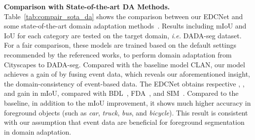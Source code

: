 \documentclass[journal]{IEEEtran}
\begin{document}

\textbf{Comparison with State-of-the-art DA Methods.}
{Table~\ref{tab:compair_sota_da} shows the comparison between our EDCNet and some state-of-the-art domain adaptation methods~\cite{wang2020differential}\cite{luo2019CLAN}\cite{li2019bidirectional}\cite{yang2020fda}. Results including mIoU and IoU for each category are tested on the target domain, \textit{i.e.} DADA-seg dataset. For a fair comparison, these models are trained based on the default settings recommended by the referenced works, to perform domain adaptation from Cityscapes to DADA-seg. Compared with the baseline model CLAN, our model achieves a gain of  by fusing event data, which reveals our aforementioned insight, the domain-consistency of event-based data. The EDCNet obtains respective , , and  gain in mIoU, compared with BDL~\cite{li2019bidirectional}, FDA~\cite{yang2020fda}, and SIM~\cite{wang2020differential}. Compared to the baseline, in addition to the mIoU improvement, it shows much higher accuracy in foreground objects (such as \emph{car}, \emph{truck}, \emph{bus}, and \emph{bicycle}). This result is consistent with our assumption that event data are beneficial for foreground segmentation in domain adaptation.}
\end{document}
